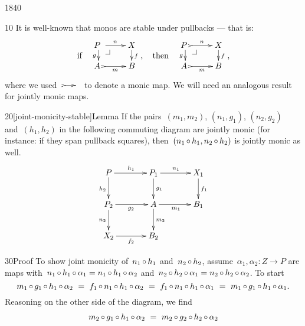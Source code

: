 \begin{parsec}{1840}%
\begin{point}{10}%
It is well-known that monos are stable under pullbacks ---
that is:
\begin{equation*}
    \text{if} \quad
    \vcenter{\vbox{\xymatrix@R-1pc{
                {P\ } \pullback \ar[r]^n \ar[d]_g
        & X \ar[d]^f
                \\ {A\ } \ar@{>->}[r]_{m}
    & B}}} ,
    \quad \text{then} \quad
    \vcenter{\vbox{\xymatrix@R-1pc{
                {P\ } \pullback \ar@{>->}[r]^n \ar[d]_g
        & X \ar[d]^f
                \\ {A\ } \ar@{>->}[r]_{m}
    & B}}},
\end{equation*}
    where we used~$\xymatrix@C-1pc{\ar@{>->}[r]&}$ to denote a monic map.
We will need an analogous result for jointly monic maps.
\end{point}
\begin{point}{20}[joint-monicity-stable]{Lemma}%
If the pairs~$(m_1,m_2)$, $(n_1,g_1)$, $(n_2,g_2)$ and~$(h_1,h_2)$
in the following commuting diagram
are jointly monic (for instance: if they span pullback squares),
then~$(n_1 \mathop{\circ} h_1, n_2 \mathop{\circ} h_2)$ is jointly monic as well.
\begin{equation*}
    \xymatrix@C+1pc{
        P \ar[r]^{h_1} \ar[d]_{h_2}
        &P_1\ar[r]^{n_1} \ar[d]^{g_1}
        &X_1 \ar[d]^{f_1}
        \\ P_2\ar[r]_{g_2} \ar[d]_{n_2}
        & A \ar[r]_{m_1} \ar[d]^{m_2}
        & B_1 
        \\ X_2 \ar[r]_{f_2}
        & B_2
    }
\end{equation*}
\spacingfix{}
\begin{point}{30}{Proof}%
To show joint monicity of~$n_1 \mathop{\circ} h_1$ and~$n_2 \mathop{\circ} h_2$,
assume~$\alpha_1,\alpha_2  \colon Z \to P$
    are maps with~$
        n_1 \mathop{\circ} h_1 \mathop{\circ} \alpha_1
        = n_1 \mathop{\circ} h_1 \mathop{\circ} \alpha_2$
    and~$n_2 \mathop{\circ} h_2 \mathop{\circ} \alpha_1
        = n_2 \mathop{\circ} h_2 \mathop{\circ} \alpha_2$.
To start
\begin{equation*}
    m_1 \mathop{\circ} g_1 \mathop{\circ} h_1 \mathop{\circ} \alpha_2
    \ =\  f_1 \mathop{\circ} n_1 \mathop{\circ} h_1 \mathop{\circ} \alpha_2 
    \ =\  f_1 \mathop{\circ} n_1 \mathop{\circ} h_1 \mathop{\circ} \alpha_1 
            \ =\  m_1 \mathop{\circ} g_1 \mathop{\circ} h_1 \mathop{\circ} \alpha_1.
\end{equation*}
Reasoning on the other side of the diagram, we find
\begin{align*}
    m_2 \after g_1 \after h_1 \after \alpha_2
    &\ =\  m_2 \after g_2 \after h_2 \after \alpha_2 \\ 

\end{align*}
\end{point}
\end{point}
\end{parsec}
